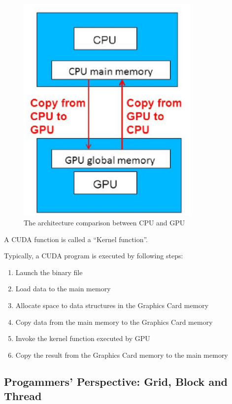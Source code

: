 \documentclass[11pt]{article}
\begin{document}
\begin{figure}[h]
    \centering
    \includegraphics[width=0.8\textwidth]{cuda_exec.eps}
    \caption{The architecture comparison between CPU and GPU}
    \label{fig:cuda_exec}
\end{figure}

A CUDA function is called a ``Kernel function''. 

Typically, a CUDA program is executed by following steps:

\begin{enumerate}
\item Launch the binary file
\item Load data to the main memory
\item Allocate space to data structures in the Graphics Card memory
\item Copy data from the main memory to the Graphics Card memory
\item Invoke the kernel function executed by GPU
\item Copy the result from the Graphics Card memory to the main memory
\end{enumerate}


\subsection{Progammers' Perspective: Grid, Block and Thread}
\end{document}
